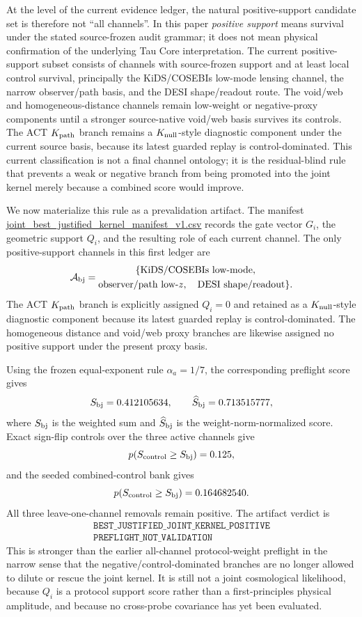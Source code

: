 \documentclass[11pt]{article}
\begin{document}
At the level of the current evidence ledger, the natural positive-support
candidate set is therefore not ``all channels''.  In this paper
\emph{positive support} means survival under the stated source-frozen audit
grammar; it does not mean physical confirmation of the underlying Tau Core
interpretation.  The current positive-support subset consists of channels with
source-frozen support and at least local control survival, principally the
KiDS/COSEBIs low-mode lensing channel, the narrow observer/path basis, and the
DESI shape/readout route.  The void/web and homogeneous-distance channels
remain low-weight or negative-proxy components until a stronger source-native
void/web basis survives its controls.  The ACT \(K_{\rm path}\) branch remains
a \(K_{\rm null}\)-style diagnostic component under the current source basis,
because its latest guarded replay is control-dominated.  This current
classification is not a final channel ontology; it is the residual-blind rule
that prevents a weak or negative branch from being promoted into the joint
kernel merely because a combined score would improve.

We now materialize this rule as a prevalidation artifact.  The manifest
\url{joint_best_justified_kernel_manifest_v1.csv} records the gate
vector \(G_i\), the geometric support \(Q_i\), and the resulting role of each
current channel.  The only positive-support channels in this first ledger are
\[
\mathcal A_{\rm bj}
=
\begin{gathered}
\{\hbox{KiDS/COSEBIs low-mode},\\
\hbox{observer/path low-}z,\quad
\hbox{DESI shape/readout}\}.
\end{gathered}
\]
The ACT \(K_{\rm path}\) branch is explicitly assigned \(Q_i=0\) and retained
as a \(K_{\rm null}\)-style diagnostic component because its latest guarded
replay is control-dominated.  The homogeneous distance and void/web proxy
branches are likewise assigned no positive support under the present proxy
basis.

Using the frozen equal-exponent rule \(\alpha_a=1/7\), the corresponding
preflight score gives
\[
S_{\rm bj}=0.412105634,\qquad
\widehat S_{\rm bj}=0.713515777,
\]
where \(S_{\rm bj}\) is the weighted sum and \(\widehat S_{\rm bj}\) is the
weight-norm-normalized score.  Exact sign-flip controls over the three active
channels give
\[
p(S_{\rm control}\ge S_{\rm bj})=0.125,
\]
and the seeded combined-control bank gives
\[
p(S_{\rm control}\ge S_{\rm bj})=0.164682540.
\]
All three leave-one-channel removals remain positive.  The artifact verdict is
\[
\begin{gathered}
\texttt{BEST\_JUSTIFIED\_JOINT\_KERNEL\_POSITIVE}\\
\texttt{PREFLIGHT\_NOT\_VALIDATION}
\end{gathered}
\]
This is stronger than the earlier all-channel protocol-weight preflight in the
narrow sense that the negative/control-dominated branches are no longer allowed
to dilute or rescue the joint kernel.  It is still not a joint cosmological
likelihood, because \(Q_i\) is a protocol support score rather than a
first-principles physical amplitude, and because no cross-probe covariance has
yet been evaluated.
\end{document}
